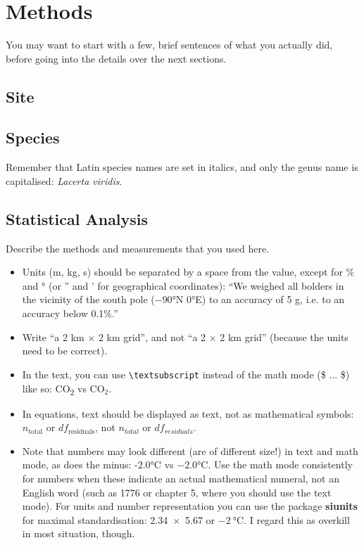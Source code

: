 \chapter{Methods}
\label{ch:methods}
You may want to start with a few, brief sentences of what you actually did, before going into the details over the next sections.

\section{Site}
\section{Species}
 Remember that Latin species names are set in italics, and only the genus name is capitalised: \emph{Lacerta viridis}.
\section{Statistical Analysis}

  Describe the methods and measurements that you used here.

\begin{itemize}
\item Units (m, kg, s) should be separated by a space from the value, except for \% and ° (or '' and ' for geographical coordinates): ``We weighed all bolders in the vicinity of the south pole ($-90$°N $0$°E) to an accuracy of 5 g, i.e. to an accuracy below 0.1\%.''

\item Write ``a 2 km $\times$ 2 km grid'', and not ``a 2 $\times$ 2 km grid'' (because the units need to be correct).

\item In the text, you can use \texttt{\textbackslash textsubscript} instead of the math mode (\$ ... \$) like so: CO\textsubscript{2} vs CO$_2$.

\item In equations, text should be displayed as text, not as mathematical symbols: $n_\text{total}$ or $df_\text{residuals}$, not $n_{total}$ or $df_{residuals}$.

\item Note that numbers may look different (are of different size!) in text and math mode, as does the minus: -2.0°C vs $-2.0$°C. Use the math mode consistently for numbers when these indicate an actual mathematical numeral, not an English word (such as 1776 or chapter 5, where you should use the text mode). For units and number representation you can use the package \textbf{siunits} for maximal standardisation: \num{2.34 x 5.67} or $\SI{-2}{\celsius}$. I regard this as overkill in most situation, though.
\end{itemize}  
 
 